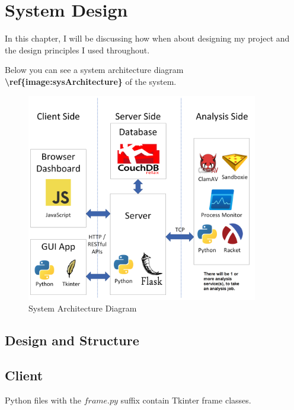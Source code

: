 \chapter{System Design}

In this chapter, I will be discussing how when about designing my project
and the design principles I used throughout.

Below you can see a system architecture diagram \textbf{\textbackslash{}ref\{image:sysArchitecture\}} of the system.

\begin{figure}[h!]
    \includegraphics[width=0.9\textwidth]{images/architecture.png}
    \caption{System Architecture Diagram}
    \label{image:sysArchitecture}
\end{figure}

\section{Design and Structure}

\section{Client}
Python files with the $frame.py$ suffix contain Tkinter frame classes.

